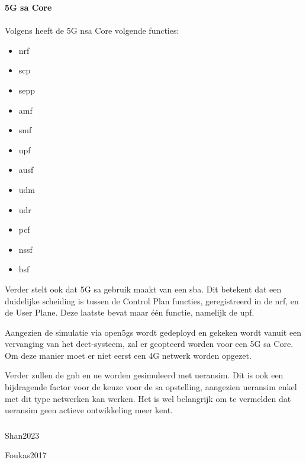 \textbf{5G \gls{sa} Core}\\\\

Volgens \textcite{Lee2025a} heeft de 5G \gls{nsa} Core volgende functies:

\begin{itemize}
  \item \gls{nrf}
  \item \gls{scp}
  \item \gls{sepp}
  \item \gls{amf}
  \item \gls{smf}
  \item \gls{upf}
  \item \gls{ausf}
  \item \gls{udm}
  \item \gls{udr}
  \item \gls{pcf}
  \item \gls{nssf}
  \item \gls{bsf}
\end{itemize}

Verder stelt \textcite{Lee2025a} ook dat 5G \gls{sa} gebruik maakt van een \gls{sba}. Dit betekent dat een duidelijke scheiding is tussen de Control Plan functies, geregistreerd in de \gls{nrf}, en de User Plane. Deze laatste bevat maar \'e\'en functie, namelijk de \gls{upf}.

Aangezien de simulatie via \gls{open5gs} wordt gedeployd en gekeken wordt vanuit een vervanging van het \gls{dect}-systeem, zal er geopteerd worden voor een 5G \gls{sa} Core. Om deze manier moet er niet eerst een 4G netwerk worden opgezet.

Verder zullen de \gls{gnb} en \gls{ue} worden gesimuleerd met \gls{ueransim}. Dit is ook een bijdragende factor voor de keuze voor de \gls{sa} opstelling, aangezien \gls{ueransim} enkel met dit type netwerken kan werken. Het is wel belangrijk om te vermelden dat \gls{ueransim} geen actieve ontwikkeling meer kent.

\subsubsection{}
\label{sec:Slicing}


Shan2023

Foukas2017

\subsubsection{}
\label{sec:Cost}

